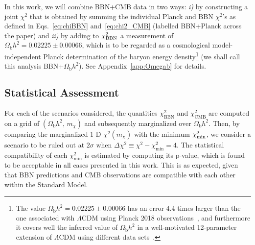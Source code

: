 In this work, we will combine BBN+CMB data in two ways: \textit{i)} by constructing a joint $\chi^2$ that is obtained by summing the individual Planck and BBN $\chi^2$'s as defined in Eqs.~\eqref{eq:chiBBN} and~\eqref{eq:chi2_CMB} (labelled BBN+Planck across the paper) and \textit{ii)} by adding to $\chi^2_{\rm BBN}$ a measurement of $\Omega_{\mathrm{b}} h^2 = 0.02225 \pm 0.00066$, which is to be regarded as a cosmological model-independent Planck determination of the baryon energy density\footnote{The value $\Omega_{\mathrm{b}} h^2 = 0.02225 \pm 0.00066$ has an error $4.4$ times larger than the one associated with $\Lambda\text{CDM}$ using Planck 2018 observations~\cite{Aghanim:2018eyx}, and furthermore it covers well the inferred value of $\Omega_{\mathrm{b}} h^2$ in a well-motivated 12-parameter extension of $\Lambda$CDM using different data sets~\cite{DiValentino:2016hlg,DiValentino:2017zyq}.} (we shall call this analysis BBN+$\Omega_{\mathrm{b}} h^2$). See Appendix~\ref{app:Omegab} for details.

\subsection{Statistical Assessment}\label{sec:Statistics}

For each of the scenarios considered, the quantities $\chi^2_{\mathrm{BBN}}$ and $\chi^2_{\mathrm{CMB}}$ are computed on a grid of $(\Omega_{\mathrm{b}} h^2,\,m_\chi)$ and subsequently marginalized over $\Omega_{\mathrm{b}} h^2$. Then, by comparing the marginalized 1-D $\chi^2 (m_\chi)$ with the minimum $\chi^2_{\rm min}$, we consider a scenario to be ruled out at $2\sigma$ when $\Delta \chi^2 \equiv \chi^2 - \chi^2_{\mathrm{min}} = 4$. The statistical compatibility of each ${\chi}^2_{\mathrm{min}}$ is estimated by computing its p-value, which is found to be acceptable in all cases presented in this work. This is as expected, given that BBN predictions and CMB observations are compatible with each other within the Standard Model.



